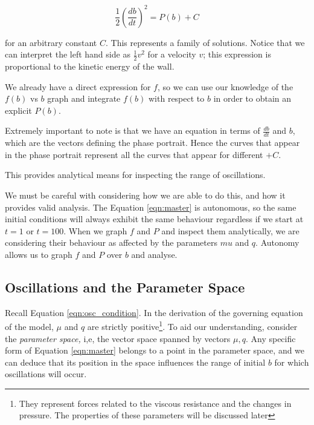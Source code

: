 \documentclass{article}
\begin{document}
\begin{equation}
    \frac{1}{2}\left(\frac{db}{dt}\right)^2 = P(b) + C
    \label{eqn:integral_kinetic_energy}
\end{equation}

for an arbitrary constant $C$. This represents a family of solutions.
Notice that we can interpret the left hand side as $\frac{1}{2}v^2$ for a velocity $v$;
this expression is proportional to the kinetic energy of the wall.

We already have a direct expression for $f$,
so we can use our knowledge of the $f(b)$ vs $b$ graph and integrate $f(b)$ with respect to $b$
in order to obtain an explicit $P(b)$.

Extremely important to note is that we have an equation in terms of $\frac{db}{dt}$ and $b$, which are the vectors defining the phase portrait.
Hence the curves that appear in the phase portrait represent all the curves that appear for different $+C$.


This provides analytical means for inspecting the range of oscillations.

We must be careful with considering how we are able to do this, and how it provides valid analysis.
The Equation \ref{eqn:master} is autonomous,
so the same initial conditions will always exhibit the same behaviour regardless if we start at $t=1$ or $t=100$.
When we graph $f$ and $P$ and inspect them analytically, we are considering their behaviour as affected by the parameters $mu$ and $q$.
Autonomy allows us to graph $f$ and $P$ over $b$ and analyse.

\subsection{Oscillations and the Parameter Space}

Recall Equation \ref{eqn:osc_condition}. In the derivation of the governing equation of the model, $\mu$ and $q$ are strictly positive\footnote{They represent forces related to the viscous resistance and the changes in pressure. The properties of these parameters will be discussed later}.
To aid our understanding, consider the \textit{parameter space,} i,e, the vector space spanned by vectors $\mu, q$.
Any specific form of Equation \ref{eqn:master} belongs to a point in the parameter space,
and we can deduce that its position in the space influences the range of initial $b$ for which oscillations will occur. 
\end{document}
